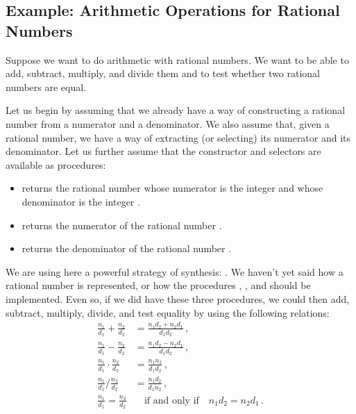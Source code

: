 \subsection{Example: Arithmetic Operations for Rational Numbers}
\label{Section 2.1.1}

Suppose we want to do arithmetic with rational numbers.
We want to be able to add, subtract, multiply, and divide them and to test whether two rational numbers are equal.

Let us begin by assuming that we already have a way of constructing a rational number from a numerator and a denominator.
We also assume that, given a rational number, we have a way of extracting (or selecting) its numerator and its denominator.
Let us further assume that the constructor and selectors are available as procedures:
\begin{itemize}

	\item
		 returns the rational number whose numerator is the integer  and whose denominator is the integer .

	\item
		 returns the numerator of the rational number .

	\item
		 returns the denominator of the rational number .

\end{itemize}

We are using here a powerful strategy of synthesis:
.
We haven’t yet said how a rational number is represented, or how the procedures , , and  should be implemented.
Even so, if we did have these three procedures, we could then add, subtract, multiply, divide, and test equality by using the following relations:
\begin{align*}
	\frac{n_1}{d_1} + \frac{n_2}{d_2} &= \frac{n_1 d_2 + n_2 d_1}{d_1 d_2} \,, \\[0.5em]
	\frac{n_1}{d_1} - \frac{n_2}{d_2} &= \frac{n_1 d_2 - n_2 d_1}{d_1 d_2} \,, \\[0.5em]
	\frac{n_1}{d_1} ⋅ \frac{n_2}{d_2} &= \frac{n_1 n_2}{d_1 d_2} \,, \\[0.5em]
	\frac{n_1}{d_1} \big/ \frac{n_2}{d_2} &= \frac{n_1 d_2}{d_1 n_2} \,, \\[0.5em]
	\frac{n_1}{d_1} = \frac{n_2}{d_2} &\quad\text{if and only if} \quad n_1 d_2 = n_2 d_1 \,.
\end{align*}


